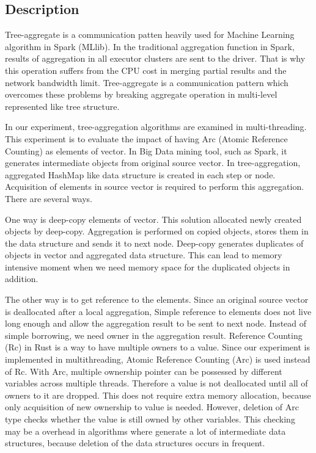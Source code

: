 \subsection{Description}
Tree-aggregate is a communication patten heavily used for Machine Learning algorithm in Spark (MLlib). 
In the traditional aggregation function in Spark, results of aggregation in all executor clusters are sent to the driver. 
That is why this operation suffers from the CPU cost in merging partial results and the network bandwidth limit.
Tree-aggregate is a communication pattern which overcomes these problems by breaking aggregate operation in multi-level represented like tree structure.

In our experiment, tree-aggregation algorithms are examined in multi-threading. This experiment is to evaluate the impact of having Arc (Atomic Reference Counting) as elements of vector. 
In Big Data mining tool, such as Spark, it generates intermediate objects from original source vector. In tree-aggregation, aggregated HashMap like data structure is created in each step or node. 
Acquisition of elements in source vector is required to perform this aggregation. There are several ways.

One way is deep-copy elements of vector. This solution allocated newly created objects by deep-copy. 
Aggregation is performed on copied objects, stores them in the data structure and sends it to next node. 
Deep-copy generates duplicates of objects in vector and aggregated data structure. 
This can lead to memory intensive moment when we need memory space for the duplicated objects in addition.

The other way is to get reference to the elements. Since an original source vector is deallocated after a local aggregation,
Simple reference to elements does not live long enough and allow the aggregation result to be sent to next node. 
Instead of simple borrowing, we need owner in the aggregation result. Reference Counting (Rc) in Rust is a way to have multiple owners to a value. 
Since our experiment is implemented in multithreading, Atomic Reference Counting (Arc) is used instead of Rc. With Arc, multiple ownership pointer can be 
possessed by different variables across multiple threads. Therefore a value is not deallocated until all of owners to it are dropped. 
This does not require extra memory allocation, because only acquisition of new ownership to value is needed. 
However, deletion of Arc type checks whether the value is still owned by other variables. 
This checking may be a overhead in algorithms where generate a lot of intermediate data structures, because deletion of the data structures occurs in frequent.

